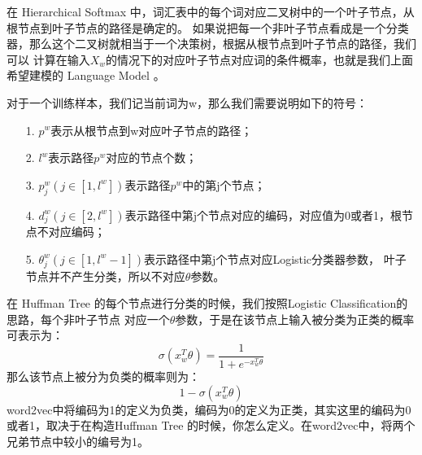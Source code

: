\documentclass[UTF8]{ctexart}
\begin{document}
\par
在 Hierarchical Softmax 中，词汇表中的每个词对应二叉树中的一个叶子节点，从根节点到叶子节点的路径是确定的。
如果说把每一个非叶子节点看成是一个分类器，那么这个二叉树就相当于一个决策树，根据从根节点到叶子节点的路径，我们可以
计算在输入$X_w$的情况下的对应叶子节点对应词的条件概率，也就是我们上面希望建模的 Language Model 。
\par
对于一个训练样本，我们记当前词为w，那么我们需要说明如下的符号：
\begin{itemize}
\item[1.] $p^w$表示从根节点到w对应叶子节点的路径；
\item[2.] $l^w$表示路径$p^w$对应的节点个数；
\item[3.] $p_j^w(j \in [1, l^w])$表示路径$p^w$中的第j个节点；
\item[4.] $d_j^w(j \in [2, l^w])$表示路径中第j个节点对应的编码，对应值为0或者1，根节点不对应编码；
\item[5.] $\theta_j^w(j \in [1, l^w-1])$表示路径中第j个节点对应Logistic分类器参数，
          叶子节点并不产生分类，所以不对应$\theta$参数。
\end{itemize}
\par
在 Huffman Tree 的每个节点进行分类的时候，我们按照Logistic Classification的思路，每个非叶子节点
对应一个$\theta$参数，于是在该节点上输入被分类为正类的概率可表示为：
\[ \sigma(x_w^T \theta) = \frac{1}{1 + e^{-x_w^T \theta}} \]
那么该节点上被分为负类的概率则为：
\[ 1 - \sigma(x_w^T\theta)\]
word2vec中将编码为1的定义为负类，编码为0的定义为正类，其实这里的编码为0或者1，取决于在构造Huffman Tree
的时候，你怎么定义。在word2vec中，将两个兄弟节点中较小的编号为1。
\end{document}
